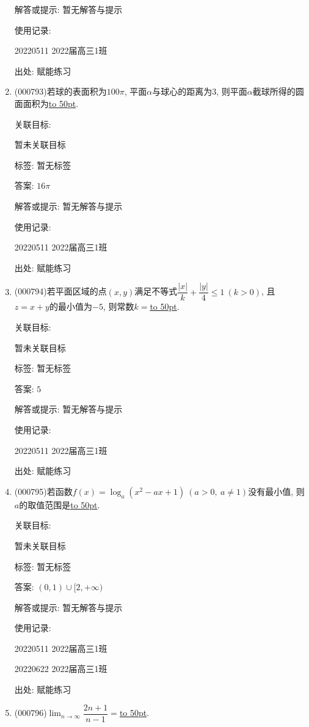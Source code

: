 \documentclass[10pt,a4paper]{article}
\newcommand{\blank}[1]{\underline{\hbox to #1pt{}}}
\begin{document}
\begin{enumerate}[1.]
解答或提示: 暂无解答与提示

使用记录:

20220511	2022届高三1班	


出处: 赋能练习
\item { (000793)}若球的表面积为$100 \pi$, 平面$\alpha$与球心的距离为$3$, 则平面$\alpha$截球所得的圆面面积为\blank{50}.


关联目标:

暂未关联目标



标签: 暂无标签

答案: $16\pi$

解答或提示: 暂无解答与提示

使用记录:

20220511	2022届高三1班	


出处: 赋能练习
\item { (000794)}若平面区域的点$(x,y)$满足不等式$\dfrac{|x|}k+\dfrac{|y|}4\le 1\ (k>0)$, 且$z=x+y$的最小值为$-5$, 则常数$k=$\blank{50}.


关联目标:

暂未关联目标



标签: 暂无标签

答案: $5$

解答或提示: 暂无解答与提示

使用记录:

20220511	2022届高三1班	


出处: 赋能练习
\item { (000795)}若函数$f(x)={\log_a}(x^2-ax+1)\ (a>0, \ a\ne 1)$没有最小值, 则$a$的取值范围是\blank{50}.


关联目标:

暂未关联目标



标签: 暂无标签

答案: $(0,1)\cup [2,+\infty)$

解答或提示: 暂无解答与提示

使用记录:

20220511	2022届高三1班	

20220622	2022届高三1班  	


出处: 赋能练习
\item { (000796)}$\displaystyle\lim_{n\to \infty}\dfrac{2n+1}{n-1}=$\blank{50}.



\end{enumerate}
\end{document}

